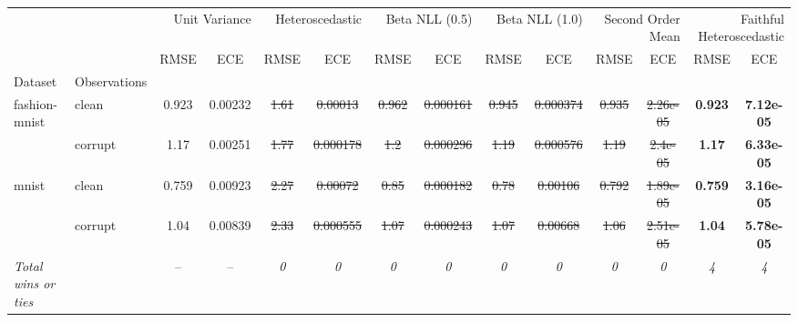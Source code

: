 \begin{tabular}{ll|cc|cc|cc|cc|cc|cc}
\toprule
{} & {} & \multicolumn{2}{r}{Unit Variance} & \multicolumn{2}{r}{Heteroscedastic} & \multicolumn{2}{r}{Beta NLL (0.5)} & \multicolumn{2}{r}{Beta NLL (1.0)} & \multicolumn{2}{r}{Second Order Mean} & \multicolumn{2}{r}{Faithful Heteroscedastic} \\
{} & {} & {RMSE} & {ECE} & {RMSE} & {ECE} & {RMSE} & {ECE} & {RMSE} & {ECE} & {RMSE} & {ECE} & {RMSE} & {ECE} \\
{Dataset} & {Observations} & {} & {} & {} & {} & {} & {} & {} & {} & {} & {} & {} & {} \\
\midrule
\multirow[t]{2}{*}{fashion-mnist} & clean & 0.923 & 0.00232 & \sout{1.61} & \sout{0.00013} & \sout{0.962} & \sout{0.000161} & \sout{0.945} & \sout{0.000374} & \sout{0.935} & \sout{2.26e-05} & \textbf{0.923} & \textbf{7.12e-05} \\
 & corrupt & 1.17 & 0.00251 & \sout{1.77} & \sout{0.000178} & \sout{1.2} & \sout{0.000296} & \sout{1.19} & \sout{0.000576} & \sout{1.19} & \sout{2.4e-05} & \textbf{1.17} & \textbf{6.33e-05} \\
\multirow[t]{2}{*}{mnist} & clean & 0.759 & 0.00923 & \sout{2.27} & \sout{0.00072} & \sout{0.85} & \sout{0.000182} & \sout{0.78} & \sout{0.00106} & \sout{0.792} & \sout{1.89e-05} & \textbf{0.759} & \textbf{3.16e-05} \\
 & corrupt & 1.04 & 0.00839 & \sout{2.33} & \sout{0.000555} & \sout{1.07} & \sout{0.000243} & \sout{1.07} & \sout{0.00668} & \sout{1.06} & \sout{2.51e-05} & \textbf{1.04} & \textbf{5.78e-05} \\
\textit{{Total wins or ties}} &  & -- & -- & \textit{0} & \textit{0} & \textit{0} & \textit{0} & \textit{0} & \textit{0} & \textit{0} & \textit{0} & \textit{4} & \textit{4} \\
\bottomrule
\end{tabular}
